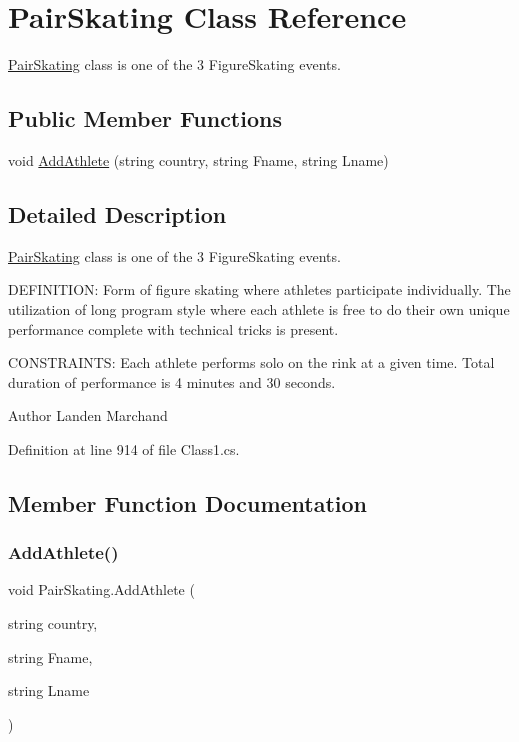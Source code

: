 \hypertarget{classPairSkating}{}\section{Pair\+Skating Class Reference}
\label{classPairSkating}


\hyperlink{classPairSkating}{Pair\+Skating} class is one of the 3 Figure\+Skating events.  


\subsection*{Public Member Functions}
\begin{DoxyCompactItemize}
\item 
void \hyperlink{classPairSkating_a32f1d4f6c99becbf394822d0abf2d508}{Add\+Athlete} (string country, string Fname, string Lname)
\end{DoxyCompactItemize}


\subsection{Detailed Description}
\hyperlink{classPairSkating}{Pair\+Skating} class is one of the 3 Figure\+Skating events. 

D\+E\+F\+I\+N\+I\+T\+I\+ON\+: Form of figure skating where athletes participate individually. The utilization of long program style where each athlete is free to do their own unique performance complete with technical tricks is present.

C\+O\+N\+S\+T\+R\+A\+I\+N\+TS\+: Each athlete performs solo on the rink at a given time. Total duration of performance is 4 minutes and 30 seconds.\begin{DoxyAuthor}{Author}
Landen Marchand 
\end{DoxyAuthor}


Definition at line 914 of file Class1.\+cs.



\subsection{Member Function Documentation}
\mbox{\label{classPairSkating_a32f1d4f6c99becbf394822d0abf2d508}} 
\subsubsection{\texorpdfstring{Add\+Athlete()}{AddAthlete()}}
{\footnotesize\ttfamily void Pair\+Skating.\+Add\+Athlete (\begin{DoxyParamCaption}\item[{string}]{country,  }\item[{string}]{Fname,  }\item[{string}]{Lname }\end{DoxyParamCaption})\hspace{0.3cm}{\ttfamily [inline]}}


